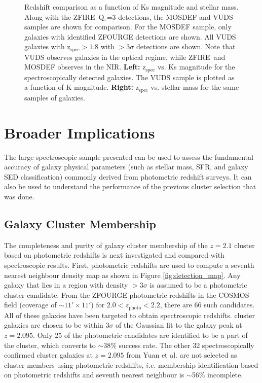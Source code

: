 \documentclass[iop]{emulateapj}
\newcommand{\around}{$\sim$}
\newcommand{\zphoto}{$z_{\mathrm{photo}}$}
\begin{document}
\begin{figure}
\caption{ Redshift comparison as a function of Ks magnitude and stellar mass. Along with the ZFIRE\ Q$_{z}$=3 detections, the MOSDEF and VUDS samples are shown for comparison. 
For the MOSDEF sample, only galaxies with identified ZFOURGE detections are shown.  All VUDS galaxies with $\mathrm{z_{spec}}>1.8$ with $>3\sigma$ detections are shown.  
Note that VUDS observes galaxies in the optical regime, while ZFIRE\ and MOSDEF observes in the NIR. 
{\bf Left:} $\mathrm{z_{spec}}$ vs. Ks magnitude for the spectroscopically detected galaxies. The VUDS sample is plotted as a function of K magnitude. 
{\bf Right:} $\mathrm{z_{spec}}$ vs. stellar mass for the same samples of galaxies.  
}
\label{fig:survey_depth_comp}
\end{figure}



\section{Broader Implications}
\label{sec:implications}

The large spectroscopic sample presented can be used to assess the fundamental accuracy of galaxy physical parameters (such as stellar mass, SFR, and galaxy
SED classification) commonly derived from photometric redshift surveys. It can also be used to understand the performance of the previous
cluster selection that was done.


\subsection{Galaxy Cluster Membership}

The completeness and purity of galaxy cluster membership of the $z=2.1$ cluster based on photometric redshifts is next investigated and compared with spectroscopic results.
First,  photometric redshifts are used to compute a seventh nearest neighbour density map as shown in Figure \ref{fig:detection_map}. 
Any galaxy that lies in a region with density $>3\sigma$ is assumed to be a photometric cluster candidate.
From the ZFOURGE photometric redshifts in the COSMOS field (coverage of $\sim 11'\times11'$) for $2.0<$\zphoto$<2.2$, there are 66 such candidates. All of these galaxies have been targeted to obtain spectroscopic redshifts. 
\citet{Yuan2014} cluster galaxies are chosen to be within $3\sigma$ of the Gaussian fit to the galaxy peak at $z = 2.095$. 
Only 25 of the photometric candidates are identified to be a part of the \citet{Yuan2014} cluster, which converts to \around38\% success rate. 
The other 32 spectroscopically confirmed cluster galaxies at $z=2.095$ from Yuan et al. are not selected as cluster members using photometric redshifts, $i.e.$ membership identification based on photometric redshifts and seventh nearest
neighbour is \around56\% incomplete. 
\end{document}

